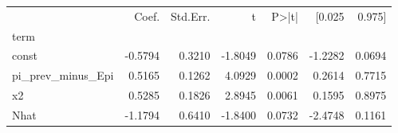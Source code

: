 \begin{tabular}{lrrrrrr}
\toprule
 & Coef. & Std.Err. & t & P>|t| & [0.025 & 0.975] \\
term &  &  &  &  &  &  \\
\midrule
const & -0.5794 & 0.3210 & -1.8049 & 0.0786 & -1.2282 & 0.0694 \\
pi_prev_minus_Epi & 0.5165 & 0.1262 & 4.0929 & 0.0002 & 0.2614 & 0.7715 \\
x2 & 0.5285 & 0.1826 & 2.8945 & 0.0061 & 0.1595 & 0.8975 \\
Nhat & -1.1794 & 0.6410 & -1.8400 & 0.0732 & -2.4748 & 0.1161 \\
\bottomrule
\end{tabular}
